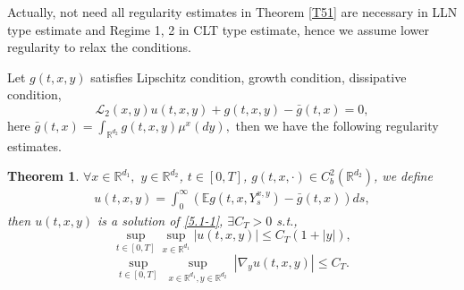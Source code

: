\documentclass[11pt,reqno]{amsart}
\newtheorem{theorem}{\indent Theorem}[section]
\numberwithin{equation}{section}
\begin{document}
Actually, not need all regularity estimates in Theorem \ref{T51} are necessary in LLN type estimate and Regime 1, 2 in CLT type estimate, hence we assume lower regularity to relax the conditions.

Let $g(t,x,y)$  satisfies Lipschitz condition, growth condition, dissipative condition,
\begin{equation}\label{5.1-1}
	\mathcal{L}_{2}(x,y)u(t,x,y)+g(t,x,y)-\bar{g}(t,x)=0,
\end{equation}
here $ \bar{g}(t,x)=\int_{\mathbb{R}^{d_{2}}}g(t,x,y)\mu^{x}(dy),$ then we have the following regularity estimates.
\begin{theorem}\label{T51-1}
	  $\forall x\in \mathbb{R}^{d_{1}}, $  $y\in \mathbb{R}^{d_{2}} $,  $t\in [0,T]$, $g(t,x,\cdot)\in C_{b}^{2}(\mathbb{R}^{d_{2}})$, %
	   we define 
	\begin{equation}\label{5.2-1}
		\begin{split}
			u(t,x,y)=\int^{\infty}_{0}\left( \mathbb{E}g(t,x,Y_{s}^{x,y})-\bar{g}(t,x)\right) ds,
		\end{split}
	\end{equation}
	then $u(t,x,y)$ is a solution of \eqref{5.1-1},  %
	$\exists C_{T}>0$ s.t.,
	\begin{equation}\label{5.3-1}
		\sup_{t\in [0,T]}\sup_{x\in \mathbb{R}^{d_{1}}}|u(t,x,y)|\leq C_{T}(1+|y|),
	\end{equation}
	\begin{equation}\label{5.4-1}
		\sup_{t\in [0,T]} \sup_{\substack{x\in \mathbb{R}^{d_{1}}, y\in \mathbb{R}^{d_{2}}}}|\nabla_{y}u(t,x,y)|\leq C_{T}.
	\end{equation}
\end{theorem}
\end{document}
